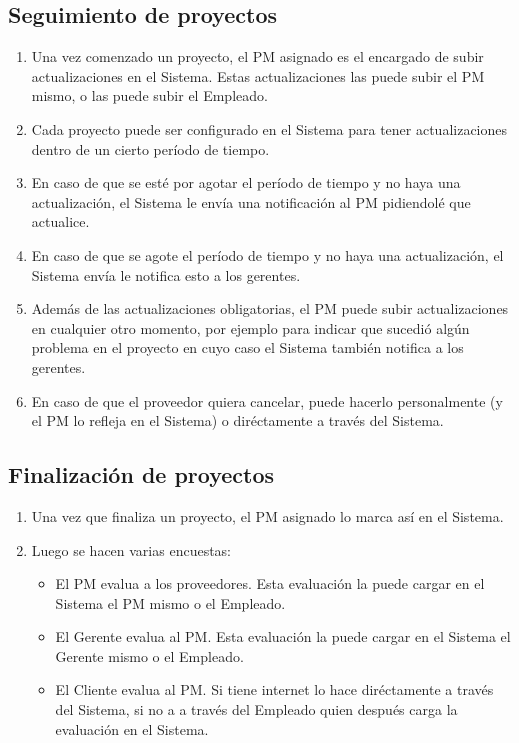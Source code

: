 \subsection{Seguimiento de proyectos}
\begin{enumerate}
    \item Una vez comenzado un proyecto, el PM asignado es el encargado de subir actualizaciones en el Sistema. Estas actualizaciones las puede subir el PM mismo, o las puede subir el Empleado.
    \item Cada proyecto puede ser configurado en el Sistema para tener actualizaciones dentro de un cierto período de tiempo.
    \item En caso de que se esté por agotar el período de tiempo y no haya una actualización, el Sistema le envía una notificación al PM pidiendolé que actualice.
    \item En caso de que se agote el período de tiempo y no haya una actualización, el Sistema envía le notifica esto a los gerentes.
    \item Además de las actualizaciones obligatorias, el PM puede subir actualizaciones en cualquier otro momento, por ejemplo para indicar que sucedió algún problema en el proyecto en cuyo caso el Sistema también notifica a los gerentes.
    \item En caso de que el proveedor quiera cancelar, puede hacerlo personalmente (y el PM lo refleja en el Sistema) o diréctamente a través del Sistema.
\end{enumerate}

\subsection{Finalización de proyectos}
\begin{enumerate}
    \item Una vez que finaliza un proyecto, el PM asignado lo marca así en el Sistema.
    \item Luego se hacen varias encuestas:
        \begin{itemize}
            \item El PM evalua a los proveedores. Esta evaluación la puede cargar en el Sistema el PM mismo o el Empleado.
            \item El Gerente evalua al PM. Esta evaluación la puede cargar en el Sistema el Gerente mismo o el Empleado.
            \item El Cliente evalua al PM. Si tiene internet lo hace diréctamente a través del Sistema, si no a a través del Empleado quien después carga la evaluación en el Sistema.
        \end{itemize}
\end{enumerate}

